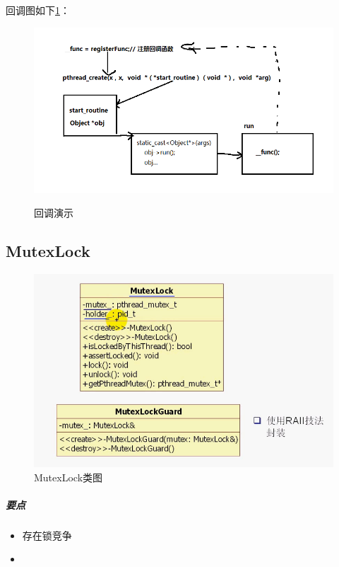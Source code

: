 \documentclass[UTF8,a4paper,8pt]{ctexbook}
\begin{document}
				回调图如下\ref{callback}：
				\begin{figure}[htbp]
					\centering
					\includegraphics[scale= 0.7]{figure/muduoCallback.png}
					\label{callback}
					\caption{回调演示}
				\end{figure}
				
		\subsection{MutexLock}
			\begin{figure}[htbp]
				\centering
				\includegraphics[scale= 0.4]{figure/muduoMutexlock.png}
				\caption{MutexLock类图}
			\end{figure}
			
			\subparagraph{要点}
				\begin{itemize}[itemindent = 2em]
					\item 存在锁竞争
					\item 
				\end{itemize}
				
\end{document}
